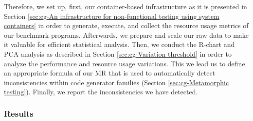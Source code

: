 Therefore, we set up, first, our container-based infrastructure as it is presented in Section \ref{sec:cg-An infrastructure for non-functional testing using system containers} in order to generate, execute, and collect the resource usage metrics of our benchmark programs.
Afterwards, we prepare and scale our raw data to make it valuable for efficient statistical analysis. Then, we conduct the R-chart and PCA analysis as described in Section \ref{sec:cg-Variation threshold} in order to analyze the performance and resource usage variations. This we lead us to define an appropriate formula of our MR that is used to automatically detect inconsistencies within code generator families (Section \ref{sec:cg-Metamorphic testing}). Finally, we report the inconsistencies we have detected.



\subsubsection{Results}
